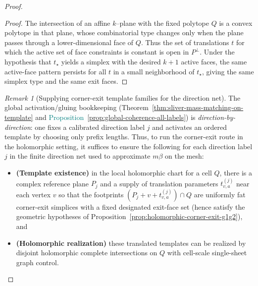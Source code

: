 \documentclass[11pt]{article}
\newcommand{\REVMZ}[1]{\textcolor{teal}{#1}}  %
\numberwithin{equation}{section}  %
\theoremstyle{plain}
\theoremstyle{definition}
\theoremstyle{remark}
\newtheorem{remark}[theorem]{Remark}
\begin{document}
\begin{proof}
\begin{proof}
The intersection of an affine $k$--plane with the fixed polytope $Q$ is a convex polytope in that plane,
whose combinatorial type changes only when the plane passes through a lower-dimensional face of $Q$.
Thus the set of translations $t$ for which the active set of face constraints is constant is open in $P^\perp$.
Under the hypothesis that $t_\star$ yields a simplex with the desired $k\!+\!1$ active faces, the same active-face pattern
persists for all $t$ in a small neighborhood of $t_\star$, giving the same simplex type and the same exit faces.
\end{proof}






















\begin{remark}[Supplying corner-exit template families for the direction net]\label{rem:corner-exit-direction-net}\label{rem:vertex-template-remarks}
The global activation/gluing bookkeeping (Theorem~\ref{thm:sliver-mass-matching-on-template} and \REVMZ{Proposition~\ref{prop:global-coherence-all-labels}})
is \emph{direction-by-direction}: one fixes a calibrated direction label $j$ and activates an ordered template by choosing only prefix lengths.
Thus, to run the corner-exit route in the holomorphic setting, it suffices to ensure the following for each direction label $j$
in the finite direction net used to approximate $m\beta$ on the mesh:
\begin{itemize}
\item \textbf{(Template existence)} in the local holomorphic chart for a cell $Q$, there is a complex reference plane $P_j$ and a supply of translation
parameters $t_{v,a}^{(j)}$ near each vertex $v$ so that the footprints $(P_j+v+t_{v,a}^{(j)})\cap Q$ are uniformly fat corner-exit simplices with a fixed
designated exit-face set (hence satisfy the geometric hypotheses of Proposition~\ref{prop:holomorphic-corner-exit-g1g2}),
and
\item \textbf{(Holomorphic realization)} these translated templates can be realized by disjoint holomorphic complete intersections on $Q$ with cell-scale single-sheet
graph control.
\end{itemize}


\end{remark}
\end{proof}
\end{document}

